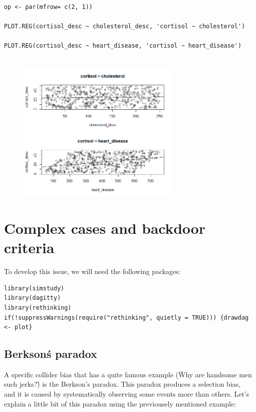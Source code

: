 \documentclass{article}
\begin{document}
\begin{lstlisting}

op <- par(mfrow= c(2, 1))

PLOT.REG(cortisol_desc ~ cholesterol_desc, 'cortisol ~ cholesterol')

PLOT.REG(cortisol_desc ~ heart_disease, 'cortisol ~ heart_disease')


\end{lstlisting}


\begin{figure}[h]
\includegraphics[width=8cm]{PLOT_CR_CH_HD.png}
\centering
\end{figure}
\newpage

\section{Complex cases and backdoor criteria}

To develop this issue, we will need the following packages:

\begin{lstlisting}
library(simstudy)
library(dagitty)
library(rethinking)
if(!suppressWarnings(require("rethinking", quietly = TRUE))) {drawdag <- plot}
\end{lstlisting}

\subsection{Berkson\'s paradox}


A specific collider bias that has a quite famous example (\"Why are handsome men such jerks?\") is the Berkson's paradox. This paradox produces a selection bias, and it is caused by systematically observing some events more than others. Let's explain a little bit of this paradox using the previousely mentioned example:
\end{document}
